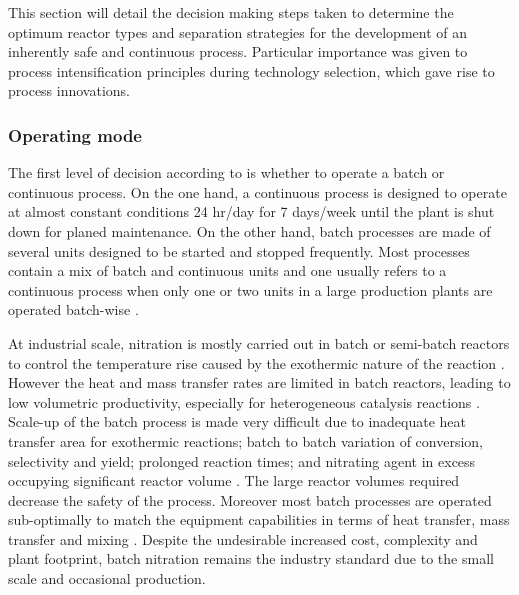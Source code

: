 This section will detail the decision making steps taken to determine the optimum reactor types and separation strategies for the development of an inherently safe and continuous process. Particular importance was given to process intensification principles during technology selection, which gave rise to process innovations.


\subsubsection{Operating mode} %
\label{sec:continuous}
The first level of decision according to \textcite{douglas_conceptual_1988} is whether to operate a batch or continuous process. On the one hand, a continuous process is designed to operate at almost constant conditions 24 hr/day for 7 days/week until the plant is shut down for planed maintenance. On the other hand, batch processes are made of several units designed to be started and stopped frequently. Most processes contain a mix of batch and continuous units and one usually refers to a continuous process when only one or two units in a large production plants are operated batch-wise \cite{douglas_conceptual_1988}. 

At industrial scale, nitration is mostly carried out in batch or semi-batch reactors to control the temperature rise caused by the exothermic nature of the reaction \cite{booth_nitro_2000,dugal_nitrobenzene_2005}. However the heat and mass transfer rates are limited in batch reactors, leading to low volumetric productivity, especially for heterogeneous catalysis reactions \cite{randall_process_2020}. Scale-up of the batch process is made very difficult due to inadequate heat transfer area for exothermic reactions; batch to batch variation of conversion, selectivity and yield; prolonged reaction times; and nitrating agent in excess occupying significant reactor volume \cite{kulkarni_continuous_2014}. The large reactor volumes required decrease the safety of the process. Moreover most batch processes are operated sub-optimally to match the equipment capabilities in terms of heat transfer, mass transfer and mixing \cite{randall_process_2020}. Despite the undesirable increased cost, complexity and plant footprint, batch nitration remains the industry standard due to the small scale and occasional production. 

